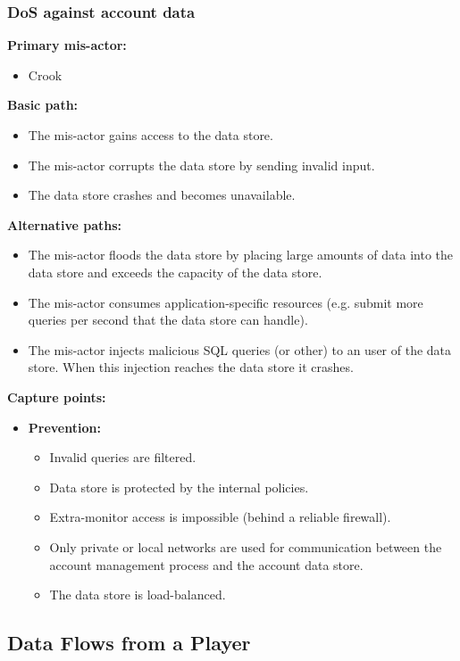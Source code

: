 \documentclass[a4paper,11pt]{report}
\begin{document}
\subsubsection{DoS against account data}
\label{AccountDataCasesD}
\textbf{Primary mis-actor:}
\begin{itemize}
\item Crook
\end{itemize}
\textbf{Basic path:}
\begin{itemize}
\item The mis-actor gains access to the data store.
\item The mis-actor corrupts the data store by sending invalid input.
\item The data store crashes and becomes unavailable.
\end{itemize}
\textbf{Alternative paths:}
\begin{itemize}
\item The mis-actor floods the data store by placing large amounts of data into the data store and exceeds the 
capacity of the data store.
\item The mis-actor consumes application-specific resources (e.g. submit more queries per second that the data 
store can handle).
\item The mis-actor injects malicious SQL queries (or other) to an user of the data store. When this injection reaches the data store it crashes.
\end{itemize}
\textbf{Capture points:}
\begin{itemize}
\item \textbf{Prevention:}
\begin{itemize}
\item Invalid queries are filtered.
\item Data store is protected by the internal policies.
\item Extra-monitor access is impossible (behind a reliable firewall).
\item Only private or local networks are used for communication between the account management process 
and the account data store.
\item The data store is load-balanced.
\end{itemize}
\end{itemize}

\subsection{Data Flows from a Player}
\label{PlayerFlowCases}
\end{document}
